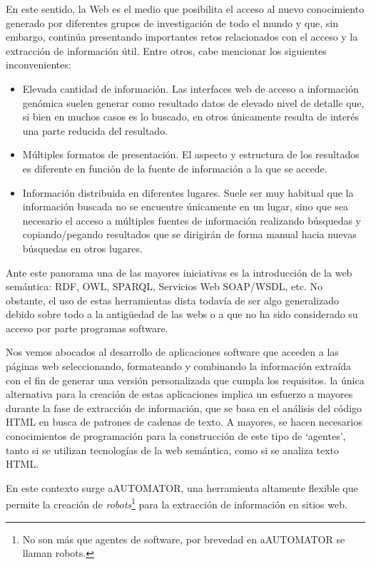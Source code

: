 En este sentido, la Web es el medio que posibilita el acceso al nuevo
conocimiento generado por diferentes grupos de investigación de todo
el mundo y que, sin embargo, continúa presentando importantes retos
relacionados con el acceso y la extracción de información
útil. Entre otros, cabe mencionar los siguientes inconvenientes:
\begin{itemize}
\item Elevada cantidad de información. Las interfaces web de acceso a
  información genómica suelen generar como resultado datos de elevado
  nivel de detalle que, si bien en muchos casos es lo buscado, en
  otros únicamente resulta de interés una parte reducida del
  resultado.
\item Múltiples formatos de presentación. El aspecto y estructura de
  los resultados es diferente en función de la fuente de información a
  la que se accede.
\item Información distribuida en diferentes lugares. Suele ser muy
  habitual que la información buscada no se encuentre únicamente en un
  lugar, sino que sea necesario el acceso a múltiples fuentes de
  información realizando búsquedas y copiando/pegando resultados que
  se dirigirán de forma manual hacia nuevas búsquedas en otros
  lugares.
\end{itemize}

Ante este panorama una de las mayores iniciativas es la introducción
de la web semántica: RDF, OWL, SPARQL, Servicios Web SOAP/WSDL,
etc. No obstante, el uso de estas herramientas dista todavía de
ser algo generalizado debido sobre todo a la antigüedad de las webs o
a que no ha sido considerado su acceso por parte programas software.

Nos vemos abocados al desarrollo de aplicaciones software que acceden
a las páginas web seleccionando, formateando y combinando la
información extraída con el fin de generar una versión personalizada
que cumpla los requisitos. la única alternativa para la creación de
estas aplicaciones implica un esfuerzo a mayores durante la fase de
extracción de información, que se basa en el análisis del código HTML
en busca de patrones de cadenas de texto. A mayores, se hacen
necesarios conocimientos de programación para la construcción de este
tipo de `agentes', tanto si se utilizan tecnologías de la web
semántica, como si se analiza texto HTML.

En este contexto surge aAUTOMATOR, una herramienta altamente flexible
que permite la creación de \emph{robots}\footnote{No son más que
  agentes de software, por brevedad en aAUTOMATOR se llaman robots.}
para la extracción de información en sitios web.

